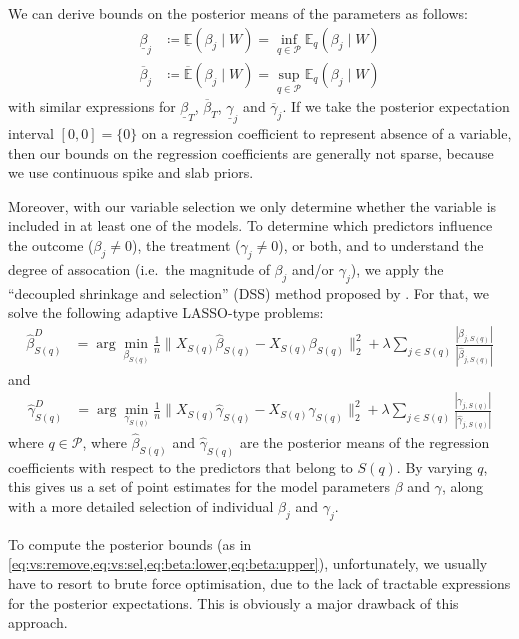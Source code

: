 \documentclass[preprint,12pt]{elsarticle}
\newcommand{\lexp}{\underline{\mathbb{E}}}
\newcommand{\uexp}{\overline{\mathbb{E}}}
\begin{document}
We can derive bounds on the posterior means of the parameters as follows:
\begin{align}
\label{eq:beta:lower}
\underline{\beta}_j&\coloneqq\lexp (\beta_j\mid W)= \inf_{q\in \mathcal{P}} \mathbb{E}_q(\beta_j\mid W) \\
\label{eq:beta:upper}
\overline{\beta}_j&\coloneqq\uexp (\beta_j\mid W)=\sup_{q\in \mathcal{P}} \mathbb{E}_q(\beta_j\mid W)
\end{align}
with similar expressions for 
$\underline{\beta}_T$, $\overline{\beta}_T$,
$\underline{\gamma}_j$ and $\overline{\gamma}_j$.
If we take the posterior expectation interval $[0,0]=\{0\}$ on a regression coefficient to represent absence of a variable, then our bounds on the regression coefficients are generally not sparse, because we use continuous 
spike and slab priors.

Moreover, with our variable selection we only determine whether the variable 
is included in at least one of the models.
To determine which predictors
influence the outcome ($\beta_j\neq 0$),
the treatment ($\gamma_j\neq 0$), or both,
and to understand the degree of assocation
(i.e.\ the magnitude of $\beta_j$ and/or $\gamma_j$),
we apply the 
``decoupled shrinkage and selection'' (DSS) method proposed by \citep{hahn2015}. 
For that, we solve the following adaptive LASSO-type \citep{Zou2006}
problems:
\begin{align}
	\hat{\beta}^D_{S(q)} &= 
	\arg\min_{\beta_{S(q)}} \frac{1}{n}\|X_{S(q)}\hat{\beta}_{S(q)}
	- X_{S(q)} \beta_{S(q)}\|_2^2 + \lambda\sum_{j\in S(q)} 
	\frac{|\beta_{j,S(q)}|}{|\hat{\beta}_{j,S(q)}|}
\end{align}
and
\begin{align}
	\hat{\gamma}^D_{S(q)} &= 
	\arg\min_{\gamma_{S(q)}} \frac{1}{n}\|X_{S(q)}\hat{\gamma}_{S(q)}
	- X_{S(q)} \gamma_{S(q)}\|_2^2 + \lambda\sum_{j\in S(q)} 
	\frac{|\gamma_{j,S(q)}|}{|\hat{\gamma}_{j,S(q)}|}
\end{align}
where $q\in \mathcal{P}$,
where $\hat{\beta}_{S(q)}$ 
and $\hat{\gamma}_{S(q)}$ are the posterior means 
of the regression coefficients with respect to
the predictors that belong to $S(q)$.
By varying $q$, this gives us a set of point estimates for the model parameters $\beta$ and $\gamma$, along with a more detailed selection of individual $\beta_j$ and $\gamma_j$.

To compute the posterior bounds (as in \cref{eq:vs:remove,eq:vs:sel,eq:beta:lower,eq:beta:upper}), unfortunately, we usually have to resort to brute force optimisation, due to the lack of tractable expressions for the posterior expectations. 
This is obviously a major drawback of this approach.
\end{document}
